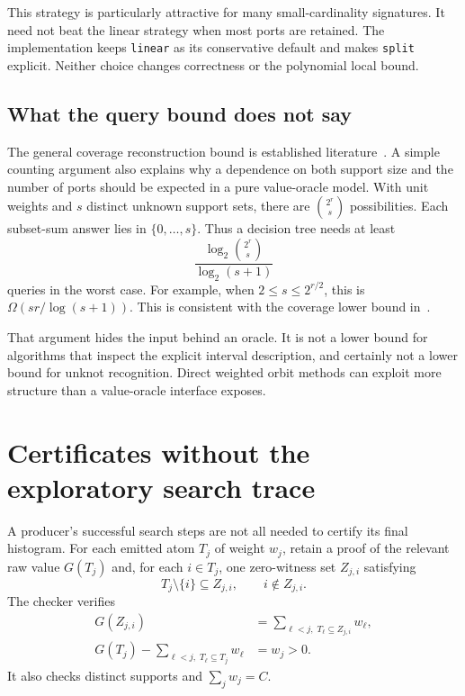 \documentclass[11pt,letterpaper]{article}
\theoremstyle{definition}\newtheorem{definition}[theorem]{Definition}
\theoremstyle{remark}\newtheorem{remark}[theorem]{Remark}
\newcommand{\api}[1]{\texttt{#1}}
\begin{document}
This strategy is particularly attractive for many small-cardinality signatures. It need not beat the linear strategy when most ports are retained. The implementation keeps \api{linear} as its conservative default and makes \api{split} explicit. Neither choice changes correctness or the polynomial local bound.

\subsection{What the query bound does not say}

The general coverage reconstruction bound is established literature~\cite{coverage}. A simple counting argument also explains why a dependence on both support size and the number of ports should be expected in a pure value-oracle model. With unit weights and $s$ distinct unknown support sets, there are $\binom{2^r}{s}$ possibilities. Each subset-sum answer lies in $\{0,\ldots,s\}$. Thus a decision tree needs at least
\[
\frac{\log_2\binom{2^r}{s}}{\log_2(s+1)}
\]
queries in the worst case. For example, when $2\le s\le2^{r/2}$, this is $\Omega(sr/\log(s+1))$. This is consistent with the coverage lower bound in~\cite[Theorem~2.4]{coverage}.

That argument hides the input behind an oracle. It is not a lower bound for algorithms that inspect the explicit interval description, and certainly not a lower bound for unknot recognition. Direct weighted orbit methods can exploit more structure than a value-oracle interface exposes.

\section{Certificates without the exploratory search trace}
\label{sec:certificates}

A producer's successful search steps are not all needed to certify its final histogram. For each emitted atom $T_j$ of weight $w_j$, retain a proof of the relevant raw value $G(T_j)$ and, for each $i\in T_j$, one zero-witness set $Z_{j,i}$ satisfying
\begin{equation}
T_j\setminus\{i\}\subseteq Z_{j,i},\qquad i\notin Z_{j,i}.
\label{eq:witnessshape}
\end{equation}
The checker verifies
\begin{align}
G(Z_{j,i})&=\sum_{\ell<j,\;T_\ell\subseteq Z_{j,i}}w_\ell,
\label{eq:witnesszero}\\
G(T_j)-\sum_{\ell<j,\;T_\ell\subseteq T_j}w_\ell&=w_j>0.
\label{eq:witnessweight}
\end{align}
It also checks distinct supports and $\sum_jw_j=C$.
\end{document}
